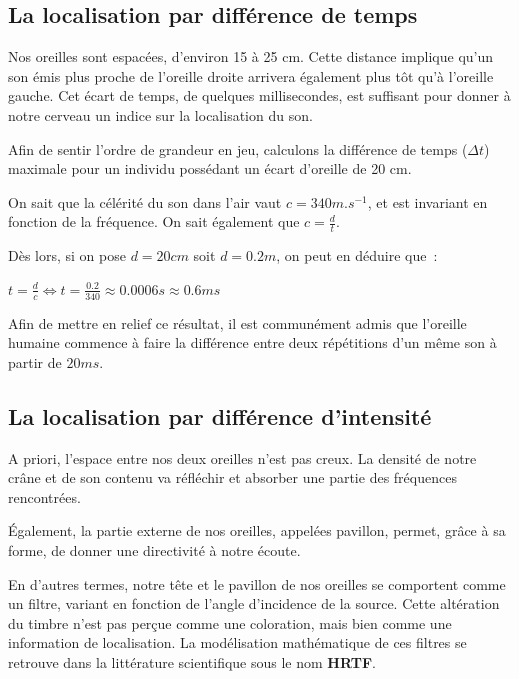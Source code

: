 \documentclass[
  letterpaper,
  DIV=11,
  numbers=noendperiod]{scrreprt}
\begin{document}
\hypertarget{la-localisation-par-diffuxe9rence-de-temps}{%
\subsection{La localisation par différence de
temps}\label{la-localisation-par-diffuxe9rence-de-temps}}

Nos oreilles sont espacées, d'environ 15 à 25 cm. Cette distance
implique qu'un son émis plus proche de l'oreille droite arrivera
également plus tôt qu'à l'oreille gauche. Cet écart de temps, de
quelques millisecondes, est suffisant pour donner à notre cerveau un
indice sur la localisation du son.

Afin de sentir l'ordre de grandeur en jeu, calculons la différence de
temps (\(\Delta t\)) maximale pour un individu possédant un écart
d'oreille de 20 cm.

On sait que la célérité du son dans l'air vaut \(c = 340 m.s^{-1}\), et
est invariant en fonction de la fréquence. On sait également que
\(c = \frac{d}{t}\).

Dès lors, si on pose \(d = 20 cm\) soit \(d = 0.2 m\), on peut en
déduire que~:

\(t = \frac{d}{c} \iff t= \frac{0.2}{340} \approx 0.0006 s \approx 0.6 ms\)

Afin de mettre en relief ce résultat, il est communément admis que
l'oreille humaine commence à faire la différence entre deux répétitions
d'un même son à partir de \(20 ms\).

\hypertarget{la-localisation-par-diffuxe9rence-dintensituxe9}{%
\subsection{La localisation par différence
d'intensité}\label{la-localisation-par-diffuxe9rence-dintensituxe9}}

A priori, l'espace entre nos deux oreilles n'est pas creux. La densité
de notre crâne et de son contenu va réfléchir et absorber une partie des
fréquences rencontrées.

Également, la partie externe de nos oreilles, appelées pavillon, permet,
grâce à sa forme, de donner une directivité à notre écoute.

En d'autres termes, notre tête et le pavillon de nos oreilles se
comportent comme un filtre, variant en fonction de l'angle d'incidence
de la source. Cette altération du timbre n'est pas perçue comme une
coloration, mais bien comme une information de localisation. La
modélisation mathématique de ces filtres se retrouve dans la littérature
scientifique sous le nom \textbf{HRTF}.
\end{document}
